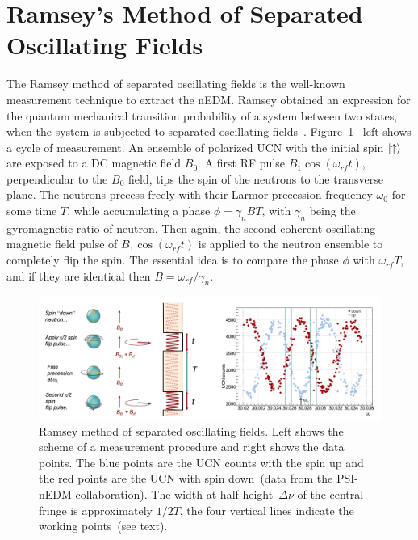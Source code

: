 \section{Ramsey's Method of Separated Oscillating
  Fields\label{sec:Ramsey}}

The Ramsey method of separated oscillating fields is the well-known
measurement technique to extract the nEDM. Ramsey obtained an
expression for the quantum mechanical transition probability of a
system between two states, when the system is subjected to separated
oscillating
fields~\cite{ramsey1950}. Figure~\ref{fig:ramsey}~\cite{Schmidt2016}
left shows a cycle of measurement. An ensemble of polarized UCN with
the initial spin $\ket{ \uparrow}$ are exposed to a DC magnetic field
$B_0$.  A first RF pulse $B_1 \cos (\omega_{rf}t)$, perpendicular to
the $B_0$ field, tips the spin of the neutrons to the transverse
plane. The neutrons precess freely with their Larmor precession
frequency $\omega_0$ for some time $T$, while accumulating a phase
$\phi = \gamma_n BT$, with $\gamma_n$ being the gyromagnetic ratio of
neutron. Then again, the second coherent oscillating magnetic field
pulse of $B_1 \cos (\omega_{rf}t)$ is applied to the neutron ensemble
to completely flip the spin. The essential idea is to compare the
phase $\phi$ with $\omega_{rf}T$, and if they are identical then
$B= \omega_{rf} / \gamma_n$.

\begin{figure}[h]
  \centering
  \includegraphics[width=1.0\textwidth]{ramsey.png}
  \caption[Ramsey cycle]{\cite{Schmidt-Wellenburg:2016nfv} Ramsey
    method of separated oscillating fields. Left shows the scheme of a
    measurement procedure and right shows the data points. The blue
    points are the UCN counts with the spin up and the red points are
    the UCN with spin down~(data from the PSI-nEDM collaboration). The
    width at half height~$\Delta \nu$ of the central fringe is
    approximately $1/2T$, the four vertical lines indicate the working
    points~(see text).}
  \label{fig:ramsey}
\end{figure}

